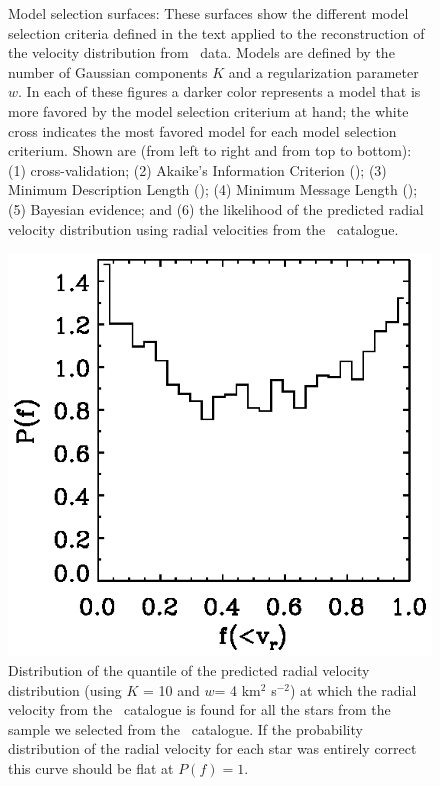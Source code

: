 \begin{figure}
\caption{Model selection surfaces: These surfaces show the different model selection criteria defined in the text applied to the reconstruction of the velocity distribution from \Hipparcos\ data. Models are defined by the number of Gaussian components $K$ and a regularization parameter $w$. In each of these figures a darker color represents a model that is more favored by the model selection criterium at hand; the white cross indicates the most favored model for each model selection criterium. Shown are (from left to right and from top to bottom): (1) cross-validation; (2) Akaike's Information Criterion (\AIC); (3) Minimum Description Length (\MDL); (4) Minimum Message Length (\MML); (5) Bayesian evidence; and (6) the likelihood of the predicted radial velocity distribution using radial velocities from the \gcsabb\ catalogue.}%
\label{fig:modelselection}
\end{figure}


\clearpage
\begin{figure}
\includegraphics{checkquants.ps}
\caption{Distribution of the quantile of the predicted radial velocity distribution (using $K$ = 10 and $w$= 4 km$^2$ s$^{-2}$) at which the radial velocity from the \gcsabb\ catalogue is found for all the stars from the sample we selected from the \gcsabb\ catalogue. If the probability distribution of the radial velocity for each star was entirely correct this curve should be flat at $P(f) = 1$.}%
\label{fig:checkquants}
\end{figure}

